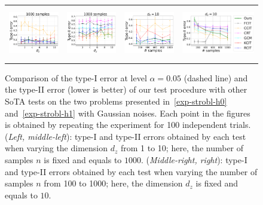 \begin{figure}[h]
\begin{tabular}{cccc} 
\includegraphics[height=2.3cm]{sections/appendix/independence_testing_kernel/figures_strobl_gaussian/nsamples_fixed_1000_strobl_dim_1_10_typeI.pdf}& \includegraphics[height=2.3cm]{sections/appendix/independence_testing_kernel/figures_strobl_gaussian/nsamples_fixed_1000_strobl_dim_1_10_typeII.pdf} & 
\includegraphics[height=2.3cm]{sections/appendix/independence_testing_kernel/figures_strobl_gaussian/dim_fixed_10_strobl_typeI.pdf}& \includegraphics[height=2.3cm]{sections/appendix/independence_testing_kernel/figures_strobl_gaussian/dim_fixed_10_strobl_typeII.pdf}
\end{tabular}
\caption{Comparison of the type-I error at level $\alpha=0.05$ (dashed line) and the type-II error (lower is better) of our test procedure with other SoTA tests on the two problems presented in~\eqref{exp-strobl-h0} and~\eqref{exp-strobl-h1}  with Gaussian noises. Each point in the figures is obtained by repeating the experiment for 100 independent trials. (\emph{Left, middle-left}): type-I and type-II errors obtained by each test when varying the dimension $d_z$ from 1 to 10; here, the number of samples $n$ is fixed and equals to $1000$. (\emph{Middle-right, right}): type-I and type-II errors obtained by each test when varying the number of samples $n$ from 100 to 1000; here, the dimension $d_z$ is fixed and equals to $10$. 
\label{fig-exp-strobl-type}}
\vspace{-0.3cm}
\end{figure}




